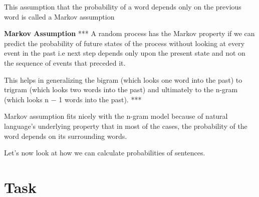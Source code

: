 \documentclass[11pt]{article}
\begin{document}
This assumption that the probability of a word depends only on the
previous word is called a Markov assumption

\textbf{Markov Assumption} *** A random process has the Markov property
if we can predict the probability of future states of the process
without looking at every event in the past i.e next step depends only
upon the present state and not on the sequence of events that preceded
it.

This helps in generalizing the bigram (which looks one word into the
past) to trigram (which looks two words into the past) and ultimately to
the n-gram (which looks n − 1 words into the past). ***

Markov assumption fits nicely with the n-gram model because of natural
language's underlying property that in most of the cases, the
probability of the word depends on its surrounding words.

Let's now look at how we can calculate probabilities of sentences.

    \hypertarget{task}{%
\section{Task}\label{task}}
\end{document}
